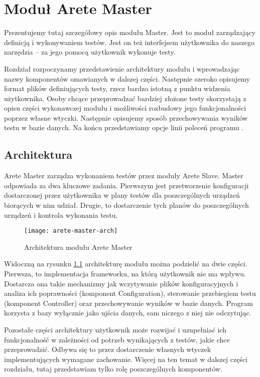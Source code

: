 \documentclass[00-praca-magisterska.tex]{subfiles}
\begin{document}
\chapter{Moduł Arete Master}

Prezentujemy tutaj szczegółowy opis modułu Master. Jest to moduł zarządzający
definicją i wykonywaniem testów. Jest on też interfejsem użytkownika do naszego
narzędzia -- za jego pomocą użytkownik wykonuje testy.

Rozdział rozpoczynamy przedstawienie architektury modułu i wprowadzając nazwy
komponentów omawianych w dalszej części. Następnie szeroko opisujemy format
plików definiujących testy, rzecz bardzo istotną z punktu widzenia użytkownika.
Osoby chcące przeprowadzać bardziej złożone testy skorzystają z opisu części
wykonawczej modułu i możliwości rozbudowy jego funkcjonalności poprzez własne
wtyczki. Następnie opisujemy sposób przechowywania wyników testu w bazie
danych. Na końcu przedstawiamy opcje linii poleceń programu .

\section{Architektura}

Arete Master zarządza wykonaniem testów przez moduły Arete Slave. Master
odpowiada za dwa kluczowe zadania. Pierwszym jest przetworzenie konfiguracji
dostarczonej przez użytkownika w plany testów dla poszczególnych urządzeń
biorących w nim udział. Drugie, to dostarczenie tych planów do poszczególnych
urządzeń i kontrola wykonania testu.

\begin{figure}[htb]
\begin{center}
\leavevmode
\texttt{[image: arete-master-arch]}
\end{center}
\caption{Architektura modułu Arete Master}
\label{fig:arete-master-arch}
\end{figure}

Widoczną na rysunku \ref{fig:arete-master-arch} architekturę modułu można
podzielić na dwie części. Pierwsza, to implementacja frameworku, na którą
użytkownik nie ma wpływu. Dostarcza ona takie mechanizmy jak wczytywanie plików
konfiguracyjnych i analiza ich poprawności (komponent Configuration),
sterowanie przebiegiem testu (komponent Controller) oraz przechowywanie wyników
w bazie danych. Program korzysta z bazy wyłącznie jako ujścia danych, sam
niczego z niej nie odczytując.

Pozostałe części architektury użytkownik może rozwijać i uzupełniać ich
funkcjonalność w zależności od potrzeb wynikających z testów, jakie chce
przeprowadzić. Odbywa się to przez dostarczenie własnych wtyczek
implementujących wymagane zachowanie. Więcej na ten temat w dalszej części
rozdziału, tutaj przedstawiam tylko rolę poszczególnych komponentów.
\end{document}
